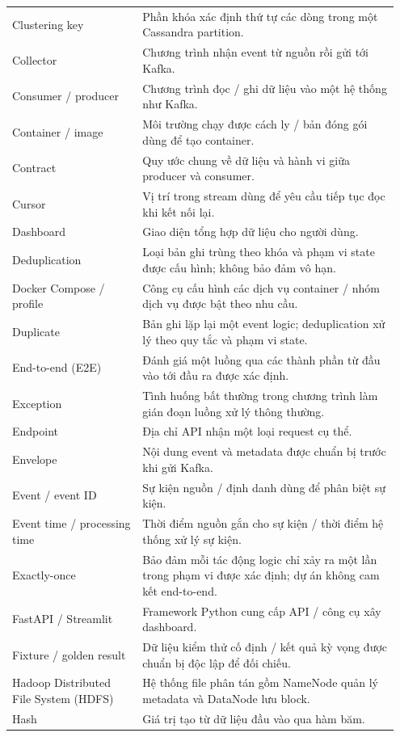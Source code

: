 \begin{longtable}{@{}p{0.32\linewidth}p{0.63\linewidth}@{}}
Clustering key & Phần khóa xác định thứ tự các dòng trong một Cassandra partition. \\
Collector & Chương trình nhận event từ nguồn rồi gửi tới Kafka. \\
Consumer / producer & Chương trình đọc / ghi dữ liệu vào một hệ thống như Kafka. \\
Container / image & Môi trường chạy được cách ly / bản đóng gói dùng để tạo container. \\
Contract & Quy ước chung về dữ liệu và hành vi giữa producer và consumer. \\
Cursor & Vị trí trong stream dùng để yêu cầu tiếp tục đọc khi kết nối lại. \\
Dashboard & Giao diện tổng hợp dữ liệu cho người dùng. \\
Deduplication & Loại bản ghi trùng theo khóa và phạm vi state được cấu hình; không bảo đảm vô hạn. \\
Docker Compose / profile & Công cụ cấu hình các dịch vụ container / nhóm dịch vụ được bật theo nhu cầu. \\
Duplicate & Bản ghi lặp lại một event logic; deduplication xử lý theo quy tắc và phạm vi state. \\
End-to-end (E2E) & Đánh giá một luồng qua các thành phần từ đầu vào tới đầu ra được xác định. \\
Exception & Tình huống bất thường trong chương trình làm gián đoạn luồng xử lý thông thường. \\
Endpoint & Địa chỉ API nhận một loại request cụ thể. \\
Envelope & Nội dung event và metadata được chuẩn bị trước khi gửi Kafka. \\
Event / event ID & Sự kiện nguồn / định danh dùng để phân biệt sự kiện. \\
Event time / processing time & Thời điểm nguồn gắn cho sự kiện / thời điểm hệ thống xử lý sự kiện. \\
Exactly-once & Bảo đảm mỗi tác động logic chỉ xảy ra một lần trong phạm vi được xác định; dự án không cam kết end-to-end. \\
FastAPI / Streamlit & Framework Python cung cấp API / công cụ xây dashboard. \\
Fixture / golden result & Dữ liệu kiểm thử cố định / kết quả kỳ vọng được chuẩn bị độc lập để đối chiếu. \\
Hadoop Distributed File System (HDFS) & Hệ thống file phân tán gồm NameNode quản lý metadata và DataNode lưu block. \\
Hash & Giá trị tạo từ dữ liệu đầu vào qua hàm băm. \\

\end{longtable}
